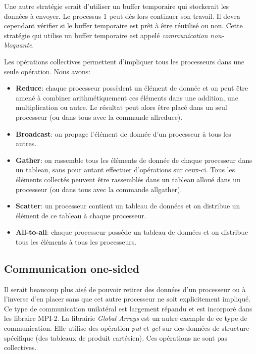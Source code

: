 	Une autre stratégie serait d'utiliser un buffer temporaire qui stockerait les données à envoyer. Le processus 1 peut dès lors continuer son travail. Il devra cependant vérifier si le buffer temporaire est prêt à être réutilisé ou non. Cette stratégie qui utilise un buffer temporaire est appelé \textit{communication non-bloquante}.
	
	Les opérations collectives permettent d'impliquer tous les processeurs dans une seule opération. Nous avons:
	\begin{itemize}
	\item \textbf{Reduce}: chaque processeur possèdent un élément de donnée et on peut être amené à combiner arithmétiquement ces éléments dans une addition, une multiplication ou autre. Le résultat peut alors être placé dans un seul processeur (ou dans tous avec la commande allreduce). 
	\item  \textbf{Broadcast}: on propage l'élément de donnée d'un processeur à tous les autres.
	\item  \textbf{Gather}: on rassemble tous les éléments de donnée de chaque processeur dans un tableau, sans pour autant effectuer d'opérations sur ceux-ci. Tous les éléments collectés peuvent être rassemblés dans un tableau alloué dans un processeur (ou dans tous avec la commande allgather). 
	\item  \textbf{Scatter}: un processeur contient un tableau de données et on distribue un élément de ce tableau à chaque processeur.
	\item  \textbf{All-to-all}: chaque processeur possède un tableau de données et on distribue tous les éléments à tous les processeurs.
	\end{itemize}
	
	\subsection{Communication one-sided}
	Il serait beaucoup plus aisé de pouvoir retirer des données d'un processeur ou à l'inverse d'en placer sans que cet autre processeur ne soit explicitement impliqué. Ce type de communication unilatéral est largement répandu et est incorporé dans les libraire MPI-2. La librairie \textit{Global Arrays} est un autre exemple de ce type de communication. Elle utilise des opération \textit{put} et \textit{get} sur des données de structure spécifique (des tableaux de produit cartésien). Ces opérations ne sont pas collectives.
	
